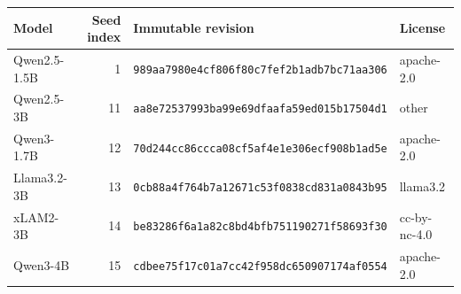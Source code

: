 \begin{tabular}{lrlp{2.1cm}}
\toprule
Model & Seed index & Immutable revision & License \\
\midrule
Qwen2.5-1.5B & 1 & \texttt{989aa7980e4cf806f80c7fef2b1adb7bc71aa306} & apache-2.0 \\
Qwen2.5-3B & 11 & \texttt{aa8e72537993ba99e69dfaafa59ed015b17504d1} & other \\
Qwen3-1.7B & 12 & \texttt{70d244cc86ccca08cf5af4e1e306ecf908b1ad5e} & apache-2.0 \\
Llama3.2-3B & 13 & \texttt{0cb88a4f764b7a12671c53f0838cd831a0843b95} & llama3.2 \\
xLAM2-3B & 14 & \texttt{be83286f6a1a82c8bd4bfb751190271f58693f30} & cc-by-nc-4.0 \\
Qwen3-4B & 15 & \texttt{cdbee75f17c01a7cc42f958dc650907174af0554} & apache-2.0 \\
\bottomrule
\end{tabular}
